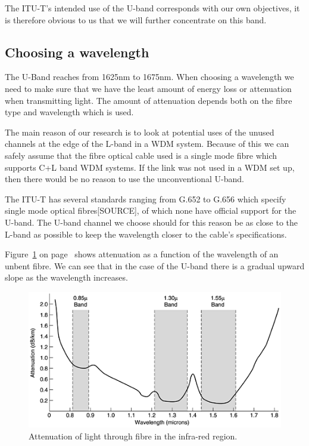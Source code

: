 \documentclass{article}
\begin{document}
The ITU-T's intended use of the U-band corresponds with our own objectives, it is therefore obvious to us that we will further concentrate on this band.

\subsection{Choosing a wavelength}
The U-Band reaches from 1625nm to 1675nm. When choosing a wavelength we need to make sure that we have the least amount of energy loss or attenuation when transmitting light.
The amount of attenuation depends both on the fibre type and wavelength which is used. 

The main reason of our research is to look at potential uses of the unused channels at the edge of the L-band in a WDM system.
Because of this we can safely assume that the fibre optical cable used is a single mode fibre which supports C+L band WDM systems.
If the link was not used in a WDM set up, then there would be no reason to use the unconventional U-band.

The ITU-T has several standards ranging from G.652 to G.656 which specify single mode optical fibres[SOURCE], of which none have official support for the U-band.
The U-band channel we choose should for this reason be as close to the L-band as possible to keep the wavelength closer to the cable's specifications.

Figure~\ref{fig:attenuation} on page~\pageref{fig:attenuation} shows attenuation as a function of the wavelength of an unbent fibre. We can see that in the case of the U-band there is a gradual upward slope as the wavelength increases.
\begin{figure}[h]
\centerline{\includegraphics[scale=0.5, trim = 0mm 0mm 0mm 0mm]{images/attenuation.png}}
\caption{Attenuation of light through fibre in the infra-red region.\cite[fig 2-6]{tannenbaum:networks}}
\label{fig:attenuation}
\end{figure}
\end{document}
